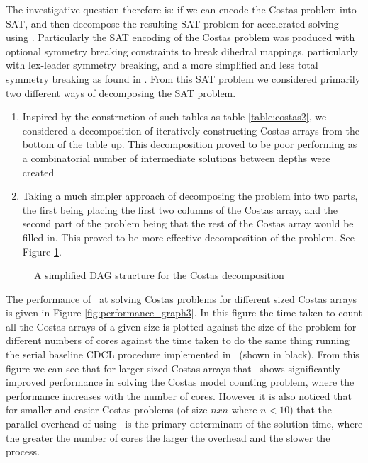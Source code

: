 \documentclass[
10pt, %
a4paper, %
oneside, %
headinclude,footinclude, %
BCOR5mm, %
]{scrartcl}
\begin{document}
The investigative question therefore is: if we can encode the Costas problem into SAT, and then decompose the resulting SAT problem for accelerated solving using \dagster.
Particularly the SAT encoding of the Costas problem was produced with optional symmetry breaking constraints to break dihedral mappings, particularly with lex-leader symmetry breaking, and a more simplified and less total symmetry breaking as found in \cite{conf/ciss/RussoEB10}.
From this SAT problem we considered primarily two different ways of decomposing the SAT problem.
\begin{enumerate}
\item	Inspired by the construction of such tables as table \ref{table:costas2}, we considered a decomposition of iteratively constructing Costas arrays from the bottom of the table up. This decomposition proved to be poor performing as a combinatorial number of intermediate solutions between depths were created
\item	Taking a much simpler approach of decomposing the problem into two parts, the first being placing the first two columns of the Costas array, and the second part of the problem being that the rest of the Costas array would be filled in. This proved to be more effective decomposition of the problem. See Figure \ref{fig:dag_example121}.
\end{enumerate}

\begin{figure}[h]
\centering
{}
\caption{A simplified DAG structure for the Costas decomposition}\label{fig:dag_example121}
\end{figure}

The performance of \dagster\ at solving Costas problems for different sized Costas arrays is given in Figure \ref{fig:performance_graph3}.
In this figure the time taken to count all the Costas arrays of a given size is plotted against the size of the problem for different numbers of cores against the time taken to do the same thing running the serial baseline CDCL procedure implemented in \tinisat\ (shown in black).
From this figure we can see that for larger sized Costas arrays that \dagster\ shows significantly improved performance in solving the Costas model counting problem, where the performance increases with the number of cores.
However it is also noticed that for smaller and easier Costas problems (of size $nxn$ where $n<10$) that the parallel overhead of using \dagster\ is the primary determinant of the solution time, where the greater the number of cores the larger the overhead and the slower the process.
\end{document}
